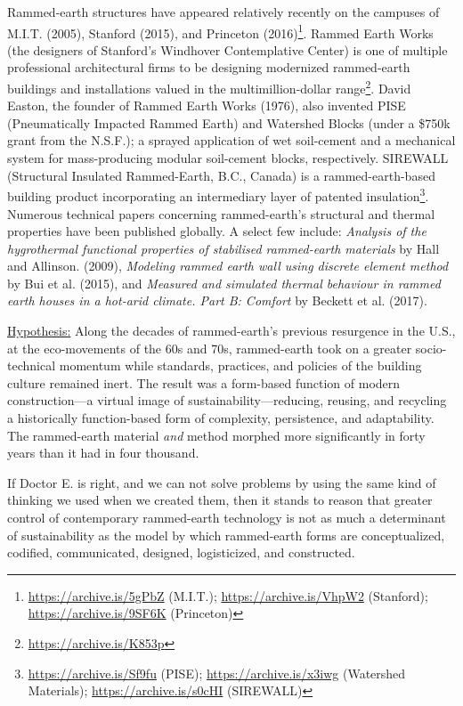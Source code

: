 Rammed-earth structures have appeared relatively recently on the campuses of M.I.T. (2005), Stanford (2015), and Princeton (2016)\footnote{\url{https://archive.is/5gPbZ} (M.I.T.); \url{https://archive.is/VhpW2} (Stanford); \url{https://archive.is/9SF6K} (Princeton)}. Rammed Earth Works (the designers of Stanford's Windhover Contemplative Center) is one of multiple professional architectural firms to be designing modernized rammed-earth buildings and installations valued in the multimillion-dollar range\footnote{\url{https://archive.is/K853p}}. David Easton, the founder of Rammed Earth Works (1976), also invented PISE (Pneumatically Impacted Rammed Earth) and Watershed Blocks (under a \$750k grant from the N.S.F.); a sprayed application of wet soil-cement and a mechanical system for mass-producing modular soil-cement blocks, respectively. SIREWALL (Structural Insulated Rammed-Earth, B.C., Canada) is a rammed-earth-based building product incorporating an intermediary layer of patented insulation\footnote{\url{https://archive.is/Sf9fu} (PISE); \url{https://archive.is/x3iwg} (Watershed Materials); \url{https://archive.is/s0cHI} (SIREWALL)}. Numerous technical papers concerning rammed-earth's structural and thermal properties have been published globally. A select few include: \textit{Analysis of the hygrothermal functional properties of stabilised rammed-earth materials} by Hall and Allinson. (2009), \textit{Modeling rammed earth wall using discrete element method} by Bui et al. (2015), and \textit{Measured and simulated thermal behaviour in rammed earth houses in a hot-arid climate. Part B: Comfort} by Beckett et al. (2017).

\vspace{5mm}

\underline{Hypothesis:} Along the decades of rammed-earth's previous resurgence in the U.S., at the eco-movements of the 60s and 70s, rammed-earth took on a greater socio-technical momentum while standards, practices, and policies of the building culture remained inert. The result was a form-based function of modern construction---a virtual image of sustainability---reducing, reusing, and recycling a historically function-based form of complexity, persistence, and adaptability. The rammed-earth material \textit{and} method morphed more significantly in forty years than it had in four thousand.

If Doctor E. is right, and we can not solve problems by using the same kind of thinking we used when we created them, then it stands to reason that greater control of contemporary rammed-earth technology is not as much a determinant of sustainability as the model by which rammed-earth forms are conceptualized, codified, communicated, designed, logisticized, and constructed.

